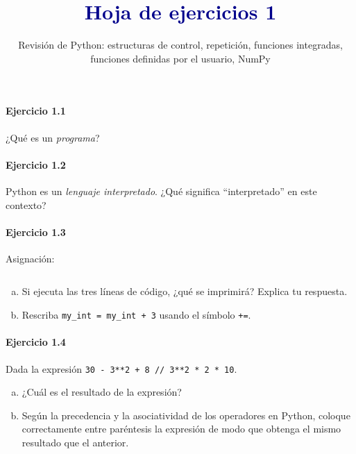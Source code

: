 


\title{\textcolor{DarkBlue}{Hoja de ejercicios 1}}
\subtitle{\color{DarkBlue}
  Revisión de Python:
  estructuras de control, repetición, 
  funciones integradas, funciones definidas por el usuario, NumPy
}



\maketitle

\paragraph{\color{DarkBlue}Ejercicio 1.1}
¿Qué es un \emph{programa}?

\paragraph{\color{DarkBlue}Ejercicio 1.2}
Python es un \emph{lenguaje interpretado}.
¿Qué significa ``interpretado'' en este contexto?

\paragraph{\color{DarkBlue}Ejercicio 1.3}
Asignación:
\begin{listing}[ht!]
	\inputminted{python}{1.3.py}
\end{listing}
\begin{enumerate}[(a)]
	\item

	      Si ejecuta las tres líneas de código, ¿qué se imprimirá?
	      Explica tu respuesta.

	\item

	      Rescriba \texttt{my_int = my_int + 3} usando el símbolo \texttt{+=}.
\end{enumerate}

\paragraph{\color{DarkBlue}Ejercicio 1.4}
Dada la expresión
\texttt{30 - 3**2 + 8 // 3**2 * 2 * 10}.

\begin{enumerate}[(a)]
	\item

	      ¿Cuál es el resultado de la expresión?

	\item

	      Según la precedencia y la asociatividad de los operadores en
	      Python, coloque correctamente entre paréntesis la expresión
	      de modo que obtenga el mismo resultado que el anterior.
\end{enumerate}

